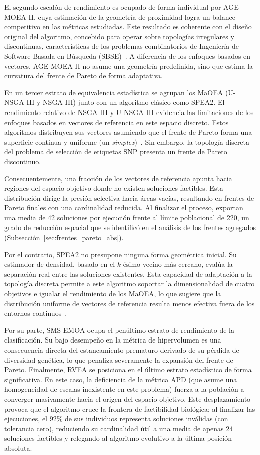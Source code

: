 El segundo escalón de rendimiento es ocupado de forma individual por AGE-MOEA-II, cuya estimación de la geometría de proximidad logra un balance competitivo en las métricas estudiadas. Este resultado es coherente con el diseño original del algoritmo, concebido para operar sobre topologías irregulares y discontinuas, características de los problemas combinatorios de Ingeniería de Software Basada en Búsqueda (SBSE)~\cite{panichella2022adaptive}. A diferencia de los enfoques basados en vectores, AGE-MOEA-II no asume una geometría predefinida, sino que estima la curvatura del frente de Pareto de forma adaptativa.

En un tercer estrato de equivalencia estadística se agrupan los MaOEA (U-NSGA-III y NSGA-III) junto con un algoritmo clásico como SPEA2. El rendimiento relativo de NSGA-III y U-NSGA-III evidencia las limitaciones de los enfoques basados en vectores de referencia en este espacio discreto. Estos algoritmos distribuyen sus vectores asumiendo que el frente de Pareto forma una superficie continua y uniforme (un \textit{simplex})~\cite{deb2013evolutionary}. Sin embargo, la topología discreta del problema de selección de etiquetas SNP presenta un frente de Pareto discontinuo. 

Consecuentemente, una fracción de los vectores de referencia apunta hacia regiones del espacio objetivo donde no existen soluciones factibles. Esta distribución dirige la presión selectiva hacia áreas vacías, resultando en frentes de Pareto finales con una cardinalidad reducida. Al finalizar el proceso, exportan una media de 42 soluciones por ejecución frente al límite poblacional de 220, un grado de reducción espacial que se identificó en el análisis de los frentes agregados (Subsección~\ref{sec:frentes_pareto_abs}).

Por el contrario, SPEA2 no presupone ninguna forma geométrica inicial. Su estimador de densidad, basado en el $k$-ésimo vecino más cercano, evalúa la separación real entre las soluciones existentes. Esta capacidad de adaptación a la topología discreta permite a este algoritmo soportar la dimensionalidad de cuatro objetivos e igualar el rendimiento de los MaOEA, lo que sugiere que la distribución uniforme de vectores de referencia resulta menos efectiva fuera de los entornos continuos~\cite{ishibuchi2015behavior}.

Por su parte, SMS-EMOA ocupa el penúltimo estrato de rendimiento de la clasificación. Su bajo desempeño en la métrica de hipervolumen es una consecuencia directa del estancamiento prematuro derivado de su pérdida de diversidad genética, lo que penaliza severamente la expansión del frente de Pareto. Finalmente, RVEA se posiciona en el último estrato estadístico de forma significativa. En este caso, la deficiencia de la métrica APD (que asume una homogeneidad de escalas inexistente en este problema) fuerza a la población a converger masivamente hacia el origen del espacio objetivo. Este desplazamiento provoca que el algoritmo cruce la frontera de factibilidad biológica; al finalizar las ejecuciones, el $92\%$ de sus individuos representa soluciones inválidas (con tolerancia cero), reduciendo su cardinalidad útil a una media de apenas 24 soluciones factibles y relegando al algoritmo evolutivo a la última posición absoluta.

